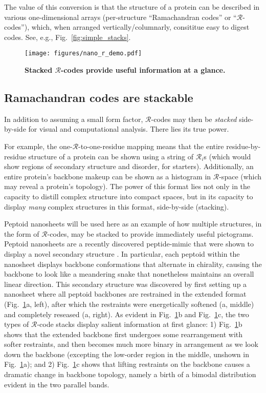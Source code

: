 \documentclass[fleqn,10pt,lineno]{wlpeerj} %
\newcommand{\Fig}[1]{Fig.~\ref{#1}}
\newcommand{\rr}{$\mathcal{R}$\xspace}
\begin{document}
The value of this conversion is that the structure of a protein can be described in various one-dimensional arrays (per-structure ``Ramachandran codes'' or ``$\mathcal{R}$-codes''), which, when arranged vertically/columnarly, consititue easy to digest codes. See, e.g., \Fig{fig:simple_stacks}. 

\begin{figure}[t!]
\centering
\texttt{[image: figures/nano\_r\_demo.pdf]}
\caption{\textbf{Stacked $\mathcal{R}$-codes provide useful information at a glance.} \label{fig:complex_stacks}} 
\end{figure}

\subsection*{Ramachandran codes are stackable}

In addition to assuming a small form factor, $\mathcal{R}$-codes may then be \textit{stacked} side-by-side for visual and computational analysis. There lies its true power.

For example, the one-$\mathcal{R}$-to-one-residue mapping means that the entire residue-by-residue structure of a protein can be shown using a string of $\mathcal{R}_i$s (which would show regions of secondary structure and disorder, for starters). Additionally, an entire protein's backbone makeup can be shown as a histogram in $\mathcal{R}$-space (which may reveal a protein's topology). The power of this format lies not only in the capacity to distill complex structure into compact spaces, but in its capacity to display {\it many} complex structures in this format, side-by-side (stacking).

Peptoid nanosheets \citep{Mannige2015} will be used here as an example of how multiple structures, in the form of \rr-codes, may be stacked to provide immediately useful pictograms. Peptoid nanosheets are a recently discovered peptide-mimic that were shown to display a novel secondary structure \citep{Mannige2015}. In particular, each peptoid within the nanosheet displays backbone conformations that alternate in chirality, causing the backbone to look like a meandering snake that nonetheless maintains an overall linear direction. This secondary structure was discovered by first setting up a nanosheet where all peptoid backbones are restrained in the extended format (\Fig{fig:complex_stacks}a, left), after which the restraints were energetically softened (a, middle) and completely reseased (a, right). As evident in \Fig{fig:complex_stacks}b and \Fig{fig:complex_stacks}c, the two types of \rr-code stacks display salient information at first glance: 1) \Fig{fig:complex_stacks}b shows that the extended backbone first undergoes some rearrangement with softer restraints, and then becomes much more binary in arrangement as we look down the backbone (excepting the low-order region in the middle, unshown in \Fig{fig:complex_stacks}a); and 2) \Fig{fig:complex_stacks}c shows that lifting restraints on the backbone causes a dramatic change in backbone topology, namely a birth of a bimodal distribution evident in the two parallel bands.
\end{document}
